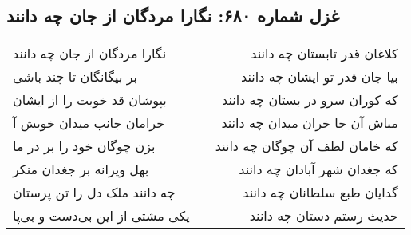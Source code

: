 \begin{center}
\section*{غزل شماره ۶۸۰: نگارا مردگان از جان چه دانند}
\label{sec:0680}
\begin{longtable}{l p{0.5cm} r}
نگارا مردگان از جان چه دانند
&&
کلاغان قدر تابستان چه دانند
\\
بر بیگانگان تا چند باشی
&&
بیا جان قدر تو ایشان چه دانند
\\
بپوشان قد خوبت را از ایشان
&&
که کوران سرو در بستان چه دانند
\\
خرامان جانب میدان خویش آ
&&
مباش آن جا خران میدان چه دانند
\\
بزن چوگان خود را بر در ما
&&
که خامان لطف آن چوگان چه دانند
\\
بهل ویرانه بر جغدان منکر
&&
که جغدان شهر آبادان چه دانند
\\
چه دانند ملک دل را تن پرستان
&&
گدایان طبع سلطانان چه دانند
\\
یکی مشتی از این بی‌دست و بی‌پا
&&
حدیث رستم دستان چه دانند
\\
\end{longtable}
\end{center}
